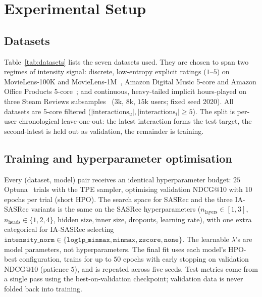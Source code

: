 \section{Experimental Setup}
\label{sec:setup}

\subsection{Datasets}
\label{sec:setup:data}

Table~\ref{tab:datasets} lists the seven datasets used. They are
chosen to span two regimes of intensity signal: discrete,
low-entropy explicit ratings ($1$--$5$) on MovieLens-100K and
MovieLens-1M~\citep{harper2015movielens},
Amazon Digital Music 5-core and Amazon Office Products 5-core~\citep{mcauley2015amazon,he2016amazonups};
and continuous, heavy-tailed implicit hours-played on three Steam
Reviews subsamples~\citep{pathak2017steam,wan2018steamreviews}
($3$k, $8$k, $15$k users; fixed seed 2020). All
datasets are 5-core filtered ($|\text{interactions}_u|, |\text{interactions}_i| \ge 5$).
The split is per-user chronological leave-one-out: the latest interaction
forms the test target, the second-latest is held out as validation, the
remainder is training.



\subsection{Training and hyperparameter optimisation}
\label{sec:setup:hpo}

Every (dataset, model) pair receives an identical hyperparameter budget:
$25$ Optuna~\citep{akiba2019optuna} trials with the TPE sampler,
optimising validation NDCG@10 with $10$ epochs per trial (short HPO).
The search space for SASRec and the three IA-SASRec variants is the
same on the SASRec hyperparameters ($n_{\mathrm{layers}}{\in}[1,3]$,
$n_{\mathrm{heads}}{\in}\{1,2,4\}$, $\mathrm{hidden\_size}, \mathrm{inner\_size}$,
dropouts, learning rate), with one extra categorical for IA-SASRec
selecting $\texttt{intensity\_norm}\in\{\texttt{log1p\_minmax},\texttt{minmax},\texttt{zscore},\texttt{none}\}$.
The learnable $\lambda$'s are model parameters, not hyperparameters.
The final fit uses each model's HPO-best configuration, trains for up
to $50$ epochs with early stopping on validation NDCG@10 (patience $5$),
and is repeated across five seeds.
Test metrics come from a single pass using the best-on-validation
checkpoint; validation data is never folded back into training.

